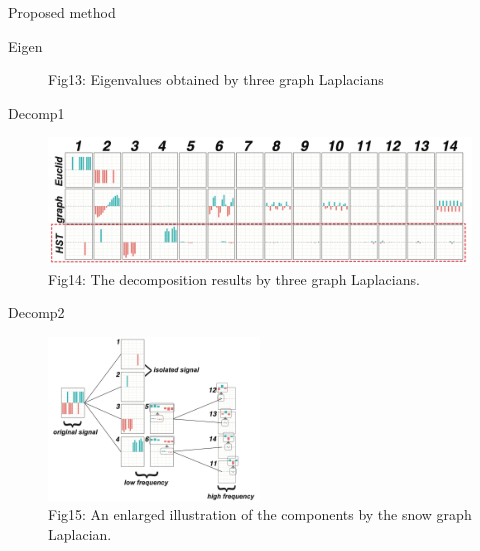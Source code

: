 \documentclass[
  ignorenonframetext,
]{beamer}
\begin{document}
\begin{frame}{Proposed method}
\begin{block}{Eigen}
\begin{figure}[H]
{}

\caption{Fig13: Eigenvalues obtained by three graph Laplacians}

\end{figure}%
\end{block}

\begin{block}{Decomp1}
\begin{figure}[H]

{\centering \includegraphics{Beamer_files/figure-beamer/1330f074-21c6-48a3-b7bb-56b2c6aa30df-2-22f5c831-a35f-455d-9060-a267cff75f6c.png}

}

\caption{Fig14: The decomposition results by three graph Laplacians.}

\end{figure}%
\end{block}

\begin{block}{Decomp2}
\begin{figure}[H]

{\centering \includegraphics[width=0.5\textwidth,height=\textheight]{Beamer_files/figure-beamer/1330f074-21c6-48a3-b7bb-56b2c6aa30df-4-ef4af1fd-a8b8-4cda-b186-aa1d9f14c775.png}

}

\caption{Fig15: An enlarged illustration of the components by the snow
graph Laplacian.}

\end{figure}%
\end{block}
\end{frame}
\end{document}
